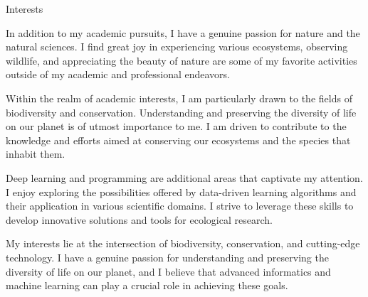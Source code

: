 \begin{rubric}{Interests}
    \begin{minipage}{\textwidth}
        \pind In addition to my academic pursuits, I have a genuine passion for nature and the natural sciences. I find great joy in experiencing various ecosystems, observing wildlife, and appreciating the beauty of nature are some of my favorite activities outside of my academic and professional endeavors.
        
        \pind Within the realm of academic interests, I am particularly drawn to the fields of biodiversity and conservation. Understanding and preserving the diversity of life on our planet is of utmost importance to me. I am driven to contribute to the knowledge and efforts aimed at conserving our ecosystems and the species that inhabit them.
        
        \pind Deep learning and programming are additional areas that captivate my attention. I enjoy exploring the possibilities offered by data-driven learning algorithms and their application in various scientific domains. I strive to leverage these skills to develop innovative solutions and tools for ecological research.
        
        \pind My interests lie at the intersection of biodiversity, conservation, and cutting-edge technology. I have a genuine passion for understanding and preserving the diversity of life on our planet, and I believe that advanced informatics and machine learning can play a crucial role in achieving these goals.
    \end{minipage}
\end{rubric}